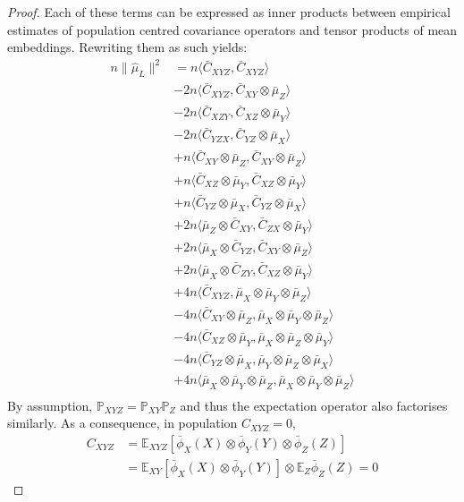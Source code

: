\documentclass[]{article}
\begin{document}
\begin{proof}
Each of these terms can be expressed as inner products between empirical estimates of population centred covariance operators and tensor products of mean embeddings. Rewriting them as such yields:
\begin{align*}
n\|\hat \mu_L\|^2 &= n\langle \bar{C}_{XYZ},\bar{C}_{XYZ} \rangle \\& -
2n\langle \bar{C}_{XYZ},\bar{C}_{XY}\otimes\bar{\mu}_Z \rangle \\& -
2n\langle \bar{C}_{XZY},\bar{C}_{XZ}\otimes\bar{\mu}_Y \rangle \\& -
2n\langle \bar{C}_{YZX},\bar{C}_{YZ}\otimes\bar{\mu}_X \rangle \\& +
n\langle \bar{C}_{XY}\otimes\bar{\mu}_Z,\bar{C}_{XY}\otimes\bar{\mu}_Z \rangle \\& +
n\langle \bar{C}_{XZ}\otimes\bar{\mu}_Y,\bar{C}_{XZ}\otimes\bar{\mu}_Y \rangle \\& +
n\langle \bar{C}_{YZ}\otimes\bar{\mu}_X,\bar{C}_{YZ}\otimes\bar{\mu}_X \rangle \\& +
2n\langle \bar{\mu}_Z\otimes\bar{C}_{XY},\bar{C}_{ZX}\otimes\bar{\mu}_Y \rangle \\& +
2n\langle \bar{\mu}_X\otimes\bar{C}_{YZ},\bar{C}_{XY}\otimes\bar{\mu}_Z \rangle \\& +
2n\langle \bar{\mu}_X\otimes\bar{C}_{ZY},\bar{C}_{XZ}\otimes\bar{\mu}_Y \rangle \\& +
4n\langle \bar{C}_{XYZ},\bar{\mu}_X \otimes\bar{\mu}_Y \otimes \bar{\mu}_Z \rangle \\& -
4n\langle \bar{C}_{XY}\otimes \bar{\mu}_Z,\bar{\mu}_X \otimes\bar{\mu}_Y \otimes \bar{\mu}_Z \rangle \\& -
4n\langle \bar{C}_{XZ}\otimes \bar{\mu}_Y,\bar{\mu}_X \otimes\bar{\mu}_Z \otimes \bar{\mu}_Y \rangle \\& -
4n\langle \bar{C}_{YZ}\otimes \bar{\mu}_X,\bar{\mu}_Y \otimes\bar{\mu}_Z \otimes \bar{\mu}_X \rangle \\& +
4n\langle \bar{\mu}_X \otimes\bar{\mu}_Y \otimes \bar{\mu}_Z,\bar{\mu}_X \otimes\bar{\mu}_Y \otimes \bar{\mu}_Z \rangle \\
\end{align*}
By assumption, $\mathbb{P}_{XYZ} =\mathbb{P}_{XY}\mathbb{P}_{Z}$ and thus the expectation operator also factorises similarly. As a consequence, in population $C_{XYZ}=0$,  
\begin{align*}
C_{XYZ} &= \mathbb{E}_{XYZ}[\bar\phi_X(X)\otimes\bar\phi_Y(Y)\otimes\bar\phi_Z(Z)] \\
& = \mathbb{E}_{XY}[\bar\phi_X(X)\otimes\bar\phi_Y(Y)]\otimes\mathbb{E}_{Z}\bar\phi_Z(Z)=0
\end{align*}


\end{proof}
\end{document}

